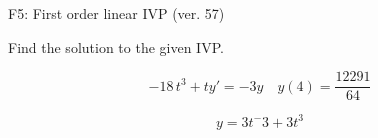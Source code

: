 \begin{exercise}
  \begin{exerciseTitle}F5: First order linear IVP (ver. 57)\end{exerciseTitle}
  \begin{exerciseStatement}
    
Find the solution to the given IVP.

    
\[-18 \, t^{3} +ty'= -3 y \hspace{1em} y( 4 ) = \frac{12291}{64}\]

  \end{exerciseStatement}
  \begin{exerciseAnswer}
    
\[y= 3 t^ -3 +3 t^{3}\]

  \end{exerciseAnswer}
\end{exercise}
